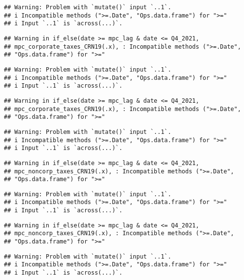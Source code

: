 \documentclass[
]{article}
\begin{document}
\begin{verbatim}
## Warning: Problem with `mutate()` input `..1`.
## i Incompatible methods (">=.Date", "Ops.data.frame") for ">="
## i Input `..1` is `across(...)`.
\end{verbatim}

\begin{verbatim}
## Warning in if_else(date >= mpc_lag & date <= Q4_2021,
## mpc_corporate_taxes_CRN19(.x), : Incompatible methods (">=.Date",
## "Ops.data.frame") for ">="
\end{verbatim}

\begin{verbatim}
## Warning: Problem with `mutate()` input `..1`.
## i Incompatible methods (">=.Date", "Ops.data.frame") for ">="
## i Input `..1` is `across(...)`.
\end{verbatim}

\begin{verbatim}
## Warning in if_else(date >= mpc_lag & date <= Q4_2021,
## mpc_corporate_taxes_CRN19(.x), : Incompatible methods (">=.Date",
## "Ops.data.frame") for ">="
\end{verbatim}

\begin{verbatim}
## Warning: Problem with `mutate()` input `..1`.
## i Incompatible methods (">=.Date", "Ops.data.frame") for ">="
## i Input `..1` is `across(...)`.
\end{verbatim}

\begin{verbatim}
## Warning in if_else(date >= mpc_lag & date <= Q4_2021,
## mpc_noncorp_taxes_CRN19(.x), : Incompatible methods (">=.Date",
## "Ops.data.frame") for ">="
\end{verbatim}

\begin{verbatim}
## Warning: Problem with `mutate()` input `..1`.
## i Incompatible methods (">=.Date", "Ops.data.frame") for ">="
## i Input `..1` is `across(...)`.
\end{verbatim}

\begin{verbatim}
## Warning in if_else(date >= mpc_lag & date <= Q4_2021,
## mpc_noncorp_taxes_CRN19(.x), : Incompatible methods (">=.Date",
## "Ops.data.frame") for ">="
\end{verbatim}

\begin{verbatim}
## Warning: Problem with `mutate()` input `..1`.
## i Incompatible methods (">=.Date", "Ops.data.frame") for ">="
## i Input `..1` is `across(...)`.
\end{verbatim}
\end{document}
